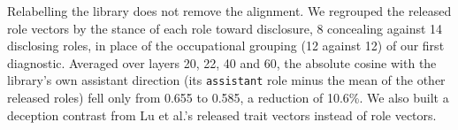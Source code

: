 Relabelling the library does not remove the alignment. %
We regrouped the released role vectors by the stance of each role toward disclosure, 8 concealing against 14 disclosing roles, in place of the occupational grouping (12 against 12) of our first diagnostic. %
Averaged over layers 20, 22, 40 and 60, the absolute cosine with the library's own assistant direction (its \texttt{assistant} role minus the mean of the other released roles) fell only from 0.655 to 0.585, a reduction of 10.6\%. %
We also built a deception contrast from Lu et al.'s released trait vectors instead of role vectors. %

